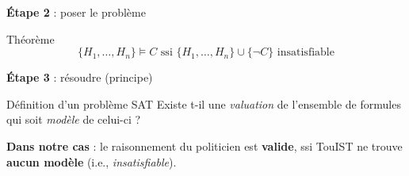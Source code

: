 \documentclass[english,french,usenames,dvipsnames]{beamer}
\begin{document}
\begin{frame}{\subsecname}
\begin{center}\textbf{Étape 2} : poser le problème\end{center}
\begin{block}{Théorème}
\[\{H_1, \dots, H_n\} \models C \mbox{ ssi } \{H_1, \dots, H_n\} \cup \{\neg C\}\text{ insatisfiable}\]
\end{block}
\end{frame}

\begin{frame}{\subsecname}
\begin{center}\textbf{Étape 3} : résoudre (principe)\end{center}
\begin{block}{Définition d'un problème SAT}
Existe t-il une \emph{valuation} de l'ensemble de formules qui soit \emph{modèle} de celui-ci ?
\end{block}

\textbf{Dans notre cas} : le raisonnement du politicien est \textbf{valide},  ssi TouIST ne trouve \textbf{aucun modèle} (i.e., \emph{insatisfiable}).
\end{frame}
\end{document}
